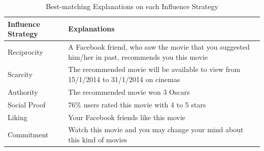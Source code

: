 \begin{table}[ht]
	\centering %
	\begin{tabular}{p{2cm} p{12cm}}  %
		\hline\hline %
		Influence Strategy & Explanations \\ %
		\hline %
		Reciprocity & A Facebook friend, who saw the movie that you suggested him/her in past, recommends you this movie \\ %
		Scarcity & The recommended movie will be available to view from 15/1/2014 to 31/1/2014 on cinemas \\
		Authority & The recommended movie won 3 Oscars\\
		Social Proof & 76\% users rated this movie with 4 to 5 stars\\
		Liking & Your Facebook friends like this movie \\
		Commitment & Watch this movie and you may change your mind about this kind of movies\\ [1ex] %
		\hline %
	\end{tabular}
	\caption{Best-matching Explanations on each Influence Strategy}
	\label{table:best-matching-explanations}
\end{table}



